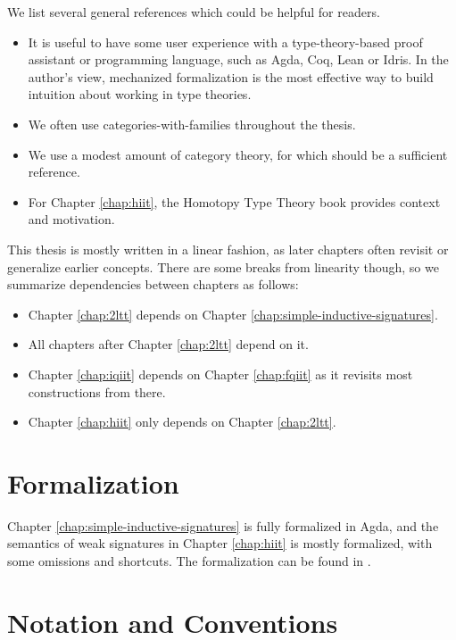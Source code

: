 \documentclass[12pt,a4paper,twoside,openany]{book}
\theoremstyle{remark}
\theoremstyle{definition}
\theoremstyle{theorem}
\begin{document}
We list several general references which could be helpful for readers.
\begin{itemize}
\item It is useful to have some user experience with a type-theory-based proof
      assistant or programming language, such as Agda, Coq, Lean or Idris. In the
      author's view, mechanized formalization is the most effective way to build
      intuition about working in type theories.
\item We often use categories-with-families \cite{cwfs,Hofmann97syntaxand,Dybjer96internaltype}
      throughout the thesis.
\item We use a modest amount of category theory, for which
      \cite{awodey2010category} should be a sufficient reference.
\item For Chapter \ref{chap:hiit}, the Homotopy Type Theory book \cite{hottbook}
      provides context and motivation.
\end{itemize}
This thesis is mostly written in a linear fashion, as later chapters often
revisit or generalize earlier concepts. There are some breaks from linearity
though, so we summarize dependencies between chapters as follows:
\begin{itemize}
  \item Chapter \ref{chap:2ltt} depends on Chapter \ref{chap:simple-inductive-signatures}.
  \item All chapters after Chapter \ref{chap:2ltt} depend on it.
  \item Chapter \ref{chap:iqiit} depends on Chapter \ref{chap:fqiit} as it
        revisits most constructions from there.
  \item Chapter \ref{chap:hiit} only depends on Chapter \ref{chap:2ltt}.
\end{itemize}

\section{Formalization}

Chapter \ref{chap:simple-inductive-signatures} is fully formalized in Agda, and
the semantics of weak signatures in Chapter \ref{chap:hiit} is mostly formalized,
with some omissions and shortcuts. The formalization can be found in \cite{ak-thesis-agda}.

\section{Notation and Conventions}
\end{document}
